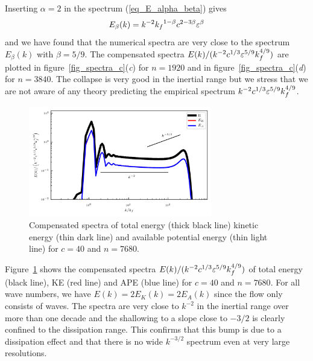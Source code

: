 Inserting $\alpha = 2$ in the spectrum (\ref{eq_E_alpha_beta}) gives
\begin{equation}
E_\beta(k) = k^{-2} {k_f}^{1-\beta} c^{2-3\beta} \varepsilon^\beta
\end{equation}
and we have found that the numerical spectra are very close to the
spectrum $E_\beta(k)$ with $\beta = 5/9$.
%
The compensated spectra $E(k) / ( k^{-2} c^{1/3} \varepsilon^{5/9} k_f^{4/9}
)$ are plotted in figure~\ref{fig_spectra_c}(\textit{c}) for $n =
1920$ and in figure~\ref{fig_spectra_c}(\textit{d}) for $n = 3840$.
The collapse is very good in the inertial range but we stress that we
are not aware of any theory predicting the empirical spectrum $k^{-2}
c^{1/3} \varepsilon^{5/9} k_f^{4/9}$.





\begin{figure}
\centerline{\includegraphics[width=8cm]{../Pyfig/fig_spectra_c=100_nh=7680}}
\caption{Compensated spectra
of total energy (thick black line)
kinetic energy (thin dark line) and
available potential energy (thin light line)
for $c = 40$ and $n = 7680$.}
\label{fig_spectra_c40}
\end{figure}

Figure~\ref{fig_spectra_c40} shows the compensated spectra $E(k) / (
k^{-2} c^{1/3} \varepsilon^{5/9} k_f^{4/9} )$ of total energy (black line),
KE (red line) and APE (blue line) for $c = 40$ and $n = 7680$.  For
all wave numbers, we have $E(k) = 2E_K(k) = 2E_A(k)$ since the flow
only consists of  waves.
%
The spectra are very close to $k^{-2}$ in the inertial range over more
than one decade and the shallowing to a slope close to $-3/2$ is
clearly confined to the dissipation range.  This confirms that this
bump is due to a dissipation effect and that there is no wide
$k^{-3/2}$ spectrum even at very large resolutions.



